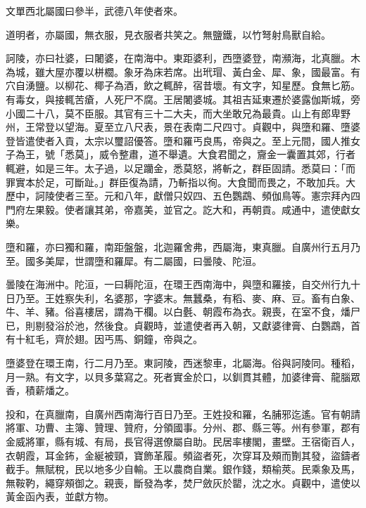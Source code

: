 \begin{pinyinscope}
 文單西北屬國曰參半，武德八年使者來。



 道明者，亦屬國，無衣服，見衣服者共笑之。無鹽鐵，以竹弩射鳥獸自給。



 訶陵，亦曰社婆，曰闍婆，在南海中。東距婆利，西墮婆登，南瀕海，北真臘。木為城，雖大屋亦覆以栟櫚。象牙為床若席。出玳瑁、黃白金、犀、象，國最富。有穴自湧鹽。以柳花、椰子為酒，飲之輒醉，宿昔壞。有文字，知星歷。食無匕筋。有毒女，與接輒苦瘡，人死尸不腐。王居闍婆城。其祖吉延東遷於婆露伽斯城，旁小國二十八，莫不臣服。其官有三十二大夫，而大坐敢兄為最貴。山上有郎卑野州，王常登以望海。夏至立八尺表，景在表南二尺四寸。貞觀中，與墮和羅、墮婆登皆遣使者入貢，太宗以璽詔優答。墮和羅丐良馬，帝與之。至上元間，國人推女子為王，號「悉莫」，威令整肅，道不舉遺。大食君聞之，齎金一囊置其郊，行者輒避，如是三年。太子過，以足躪金，悉莫怒，將斬之，群臣固請。悉莫曰：「而罪實本於足，可斷趾。」群臣復為請，乃斬指以徇。大食聞而畏之，不敢加兵。大歷中，訶陵使者三至。元和八年，獻僧只奴四、五色鸚鵡、頻伽鳥等。憲宗拜內四門府左果毅。使者讓其弟，帝嘉美，並官之。訖大和，再朝貢。咸通中，遣使獻女樂。



 墮和羅，亦曰獨和羅，南距盤盤，北迦羅舍弗，西屬海，東真臘。自廣州行五月乃至。國多美犀，世謂墮和羅犀。有二屬國，曰曇陵、陀洹。



 曇陵在海洲中。陀洹，一曰耨陀洹，在環王西南海中，與墮和羅接，自交州行九十日乃至。王姓察失利，名婆那，字婆末。無蠶桑，有稻、麥、麻、豆。畜有白象、牛、羊、豬。俗喜樓居，謂為干欄。以白氎、朝霞布為衣。親喪，在室不食，燔尸已，則剔發浴於池，然後食。貞觀時，並遣使者再入朝，又獻婆律膏、白鸚鵡，首有十紅毛，齊於翅。因丐馬、銅鐘，帝與之。



 墮婆登在環王南，行二月乃至。東訶陵，西迷黎車，北屬海。俗與訶陵同。種稻，月一熟。有文字，以貝多葉寫之。死者實金於口，以釧貫其體，加婆律膏、龍腦眾香，積薪燔之。



 投和，在真臘南，自廣州西南海行百日乃至。王姓投和羅，名脯邪迄遙。官有朝請將軍、功曹、主簿、贊理、贊府，分領國事。分州、郡、縣三等。州有參軍，郡有金威將軍，縣有城、有局，長官得選僚屬自助。民居率樓閣，畫壁。王宿衛百人，衣朝霞，耳金鈽，金綖被頸，寶飾革履。頻盜者死，次穿耳及頰而劗其發，盜鑄者截手。無賦稅，民以地多少自輸。王以農商自業。銀作錢，類榆莢。民乘象及馬，無鞍靮，繩穿頰御之。親喪，斷發為孝，焚尸斂灰於罌，沈之水。貞觀中，遣使以黃金函內表，並獻方物。




\end{pinyinscope}
